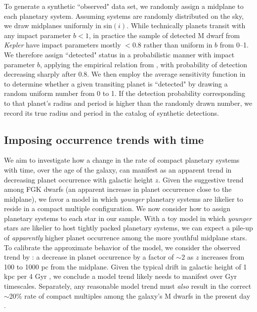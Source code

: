 \documentclass[twocolumn]{aastex631}
\begin{document}
 To generate a synthetic ``observed" data set, we randomly assign a midplane to each planetary system. Assuming systems are randomly distributed on the sky, we draw midplanes uniformly in sin$(i)$. While technically planets transit with any impact parameter $b<1$, in practice the sample of detected M dwarf from \textit{Kepler} have impact parameters mostly $<$0.8 \citep{Swift15} rather than uniform in $b$ from 0--1. We therefore assign ``detected" status in a probabilistic manner with impact parameter $b$, applying the empirical relation from \cite{Swift15}, with probability of detection decreasing sharply after 0.8. We then employ the average sensitivity function in \cite{Dressing15} to determine whether a given transiting planet is ``detected" by drawing a random uniform number from 0 to 1. If the detection probability corresponding to that planet's radius and period is higher than the randomly drawn number, we record its true radius and period in the catalog of synthetic detections. 

\subsection{Imposing occurrence trends with time}
\label{subsection:decay}
We aim to investigate how a change in the rate of compact planetary systems with time, over the age of the galaxy, can manifest as an apparent trend in decreasing planet occurrence with galactic height $z$. Given the suggestive trend among FGK dwarfs (an apparent increase in planet occurrence close to the midplane), we favor a model in which \textit{younger} planetary systems are likelier to reside in a compact multiple configuration. We now consider how to assign planetary systems to each star in our sample.  With a toy model in which \textit{younger} stars are likelier to host tightly packed planetary systems, we can expect a pile-up of \textit{apparently} higher planet occurrence among the more youthful midplane stars. To calibrate the approximate behavior of the model, we consider the observed trend by \cite{zink_scaling_2023}: a decrease in planet occurrence by a factor of $\sim2$ as $z$ increases from 100 to 1000 pc from the midplane. Given the typical drift in galactic height of 1 kpc per 4 Gyr \citep{casagrande_measuring_2016}, we conclude a model trend likely needs to manifest over Gyr timescales. Separately, any reasonable model trend must \textit{also} result in the correct $\sim$20\% rate of compact multiples among the galaxy's M dwarfs in the present day \citep{Muirhead15, Ballard16}. 
\end{document}
